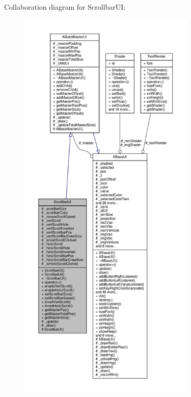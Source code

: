 Collaboration diagram for Scrollbar\+UI\+:
\nopagebreak
\begin{figure}[H]
\begin{center}
\leavevmode
\includegraphics[height=550pt]{class_scrollbar_u_i__coll__graph}
\end{center}
\end{figure}
